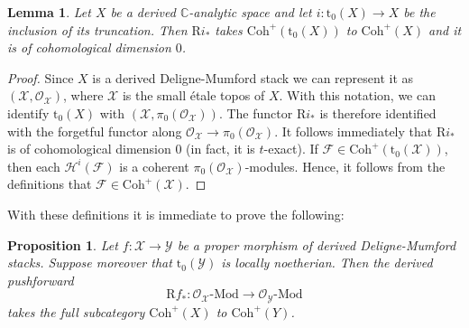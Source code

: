 \documentclass[12pt,a4paper,reqno]{amsart}
\theoremstyle{plain}
\newtheorem{lem}[thm]{Lemma}
\newtheorem{prop}[thm]{Proposition}
\theoremstyle{definition}
\theoremstyle{remark}
\numberwithin{equation}{section}
\begin{document}
\begin{lem} \label{lem:proper_direct_image_DM_truncation}
	Let $X$ be a derived {$\mathbb C$-analytic\xspace} space and let $i \colon {\mathrm{t}_0}(X) \to X$ be the inclusion of its truncation.
	Then ${\mathrm R} i_*$ takes ${\mathrm{Coh}}^+({\mathrm{t}_0}(X))$ to ${\mathrm{Coh}}^+(X)$ and it is of cohomological dimension $0$.
\end{lem}

\begin{proof}
	Since $X$ is a derived {Deligne-Mumford\xspace} stack we can represent it as $({\mathcal X}, {\mathcal O}_{\mathcal X})$, where ${\mathcal X}$ is the small \'etale topos of $X$.
	With this notation, we can identify ${\mathrm{t}_0}(X)$ with $({\mathcal X}, \pi_0({\mathcal O}_{\mathcal X}))$.
	The functor ${\mathrm R} i_*$ is therefore identified with the forgetful functor along ${\mathcal O}_{\mathcal X} \to \pi_0({\mathcal O}_{\mathcal X})$.
	It follows immediately that ${\mathrm R} i_*$ is of cohomological dimension $0$ (in fact, it is $t$-exact).
	If ${\mathcal F} \in {\mathrm{Coh}}^+({\mathrm{t}_0}({\mathcal X}))$, then each ${\mathcal H}^i({\mathcal F})$ is a coherent $\pi_0({\mathcal O}_{\mathcal X})$-modules.
	Hence, it follows from the definitions that ${\mathcal F} \in {\mathrm{Coh}}^+({\mathcal X})$.
\end{proof}

With these definitions it is immediate to prove the following:

\begin{prop} \label{prop:proper_direct_image_derived_DM_stacks}
	Let $f \colon {\mathcal X} \to {\mathcal Y}$ be a proper morphism of derived {Deligne-Mumford\xspace} stacks.
	Suppose moreover that ${\mathrm{t}_0}({\mathcal Y})$ is locally noetherian.
	Then the derived pushforward
	\[ {\mathrm R} f_* \colon {\mathcal O}_{\mathcal X} \textrm{-} {\mathrm{Mod}} \to {\mathcal O}_{\mathcal Y} \textrm{-} {\mathrm{Mod}} \]
	takes the full subcategory ${\mathrm{Coh}}^+(X)$ to ${\mathrm{Coh}}^+(Y)$.
\end{prop}
\end{document}
